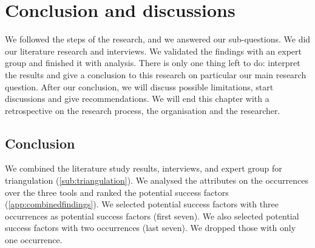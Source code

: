 \chapter{Conclusion and discussions}
\label{ch:conclusionanddiscussions}
We followed the steps of the research, and we answered our sub-questions. We did our literature research and interviews. We validated the findings with an expert group and finished it with analysis. There is only one thing left to do: interpret the results and give a conclusion to this research on particular our main research question. After our conclusion, we will discuss possible limitations, start discussions and give recommendations. We will end this chapter with a retrospective on the research process, the organisation and the researcher.

\section{Conclusion}
\label{sec:conclusion}
We combined the literature study results, interviews, and expert group for \gls{triangulation} (\cref{sub:triangulation}). We analysed the \glspl{attribute} on the occurrences over the three tools and ranked the potential success factors (\cref{app:combinedfindings}). We selected potential success factors with three occurrences as potential success factors (first seven). We also selected potential success factors with two occurrences (last seven). We dropped those with only one occurrence.

